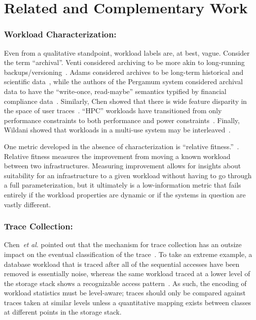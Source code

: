 
\section{Related and Complementary Work}%
\label{sec:related}

\subsubsection*{Workload Characterization: }

Even from a qualitative standpoint, workload labels are, at best, vague.
Consider the term ``archival''. Venti considered archiving to be more akin to
long-running backups/versioning~\cite{venti}. Adams \etal considered
archives to be long-term historical and scientific data~\cite{ian-tos}, while
the authors of the Pergamum system considered archival data to have the ``write-once,
read-maybe'' semantics typified by financial compliance data~\cite{storerfast2008}.
Similarly, Chen \etal showed that there is wide feature disparity in the space
of user traces~\cite{chen-kmeans}.  ``HPC'' workloads have transitioned from
only performance constraints to both performance and power
constraints~\cite{hpcpower}.  Finally, Wildani \etal showed that workloads
in a multi-use system may be interleaved~\cite{hands}. 

One metric developed in the absence of characterization is ``relative
fitness.''~\cite{mesnier07}.  Relative fitness measures the improvement from
moving a known workload between two infrastructures.  Measuring improvement
allows for insights about suitability for an infrastructure to a given workload
without having to go through a full parameterization, but it ultimately is a
low-information metric that fails entirely if the workload properties are
dynamic or if the systems in question are vastly different.  

\subsubsection*{Trace Collection: }
Chen~\emph{et al.} pointed out that
the mechanism for trace collection has an outsize impact on the eventual
classification of the trace~\cite{chen-kmeans}.  To take an extreme
example, a database workload that is traced after all of the sequential accesses
have been removed is essentially noise, whereas the same workload traced at a
lower level of the storage stack shows a recognizable access
pattern~\cite{hands}.  As such, the encoding of workload statistics must be
level-aware; traces should only be compared against traces taken at similar
levels unless a quantitative mapping exists between classes at different points
in the storage stack.  


